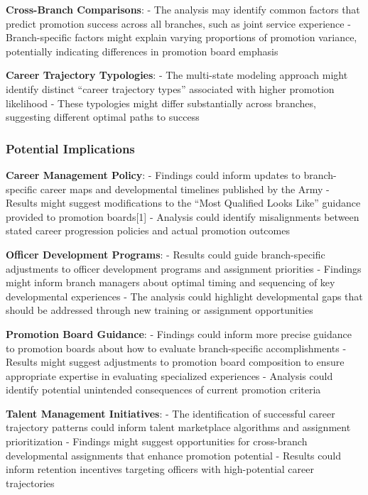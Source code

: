 \documentclass[
  letterpaper,
  DIV=11,
  numbers=noendperiod]{scrartcl}
\begin{document}
\textbf{Cross-Branch Comparisons}: - The analysis may identify common
factors that predict promotion success across all branches, such as
joint service experience - Branch-specific factors might explain varying
proportions of promotion variance, potentially indicating differences in
promotion board emphasis

\textbf{Career Trajectory Typologies}: - The multi-state modeling
approach might identify distinct ``career trajectory types'' associated
with higher promotion likelihood - These typologies might differ
substantially across branches, suggesting different optimal paths to
success

\subsubsection{Potential Implications}\label{potential-implications}

\textbf{Career Management Policy}: - Findings could inform updates to
branch-specific career maps and developmental timelines published by the
Army - Results might suggest modifications to the ``Most Qualified Looks
Like'' guidance provided to promotion boards{[}1{]} - Analysis could
identify misalignments between stated career progression policies and
actual promotion outcomes

\textbf{Officer Development Programs}: - Results could guide
branch-specific adjustments to officer development programs and
assignment priorities - Findings might inform branch managers about
optimal timing and sequencing of key developmental experiences - The
analysis could highlight developmental gaps that should be addressed
through new training or assignment opportunities

\textbf{Promotion Board Guidance}: - Findings could inform more precise
guidance to promotion boards about how to evaluate branch-specific
accomplishments - Results might suggest adjustments to promotion board
composition to ensure appropriate expertise in evaluating specialized
experiences - Analysis could identify potential unintended consequences
of current promotion criteria

\textbf{Talent Management Initiatives}: - The identification of
successful career trajectory patterns could inform talent marketplace
algorithms and assignment prioritization - Findings might suggest
opportunities for cross-branch developmental assignments that enhance
promotion potential - Results could inform retention incentives
targeting officers with high-potential career trajectories
\end{document}
